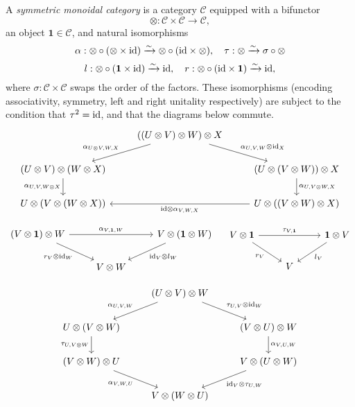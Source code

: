 \documentclass{MetricNotes2023}
\def\id{\ensuremath\text{id}}
\begin{document}
\begin{definition}\label{def:monoidal}
A \textit{symmetric monoidal category} is a category \(\mathcal{C}\) equipped with a bifunctor 
\[\otimes : \mathcal{C} \times \mathcal{C}\to \mathcal{C},\]
an object \(\textbf{1}\in \mathcal{C}\), and natural isomorphisms
\[\alpha : \otimes \circ (\otimes \times \id) \xrightarrow{\sim}\otimes \circ (\id \times \otimes),\quad \tau : \otimes \xrightarrow\sim \sigma \circ \otimes\]
\[l : \otimes \circ (\textbf{1}\times \id)\xrightarrow\sim \id, \quad r : \otimes \circ (\id \times \textbf{1})\xrightarrow\sim \id,\]
where \(\sigma : \mathcal{C} \times \mathcal{C}\) swaps the order of the factors. These isomorphisms (encoding associativity, symmetry, left and right unitality respectively) are subject to the condition that \(\tau^2=\id\), and that the diagrams below commute.
\[\begin{tikzcd}
& ((U\otimes V)\otimes W)\otimes X \arrow[ld, swap, "\alpha_{U\otimes V, W, X}"] \arrow[rd, "\alpha_{U, V, W}\otimes \id_X"]  & \\
(U\otimes V)\otimes (W\otimes X) \arrow[d, swap, "\alpha_{U, V, W\otimes X}"]  & & (U\otimes(V\otimes W))\otimes X \arrow[d, "\alpha_{U, V\otimes W, X}"]\\
U\otimes(V\otimes(W\otimes X)) & & U\otimes((V\otimes W)\otimes X) \arrow[ll, "\id\otimes \alpha_{V, W,X}"]
\end{tikzcd}\]

\[\begin{tikzcd}
(V\otimes \textbf{1})\otimes W \arrow[rr, "\alpha_{V, \textbf{1}, W}"] \arrow[dr, swap, "r_V\otimes \id_W"]  & & V\otimes (\textbf{1}\otimes W) \arrow[dl, "\id_V\otimes l_W"]  \\
& V\otimes W & 
\end{tikzcd} \quad \begin{tikzcd}
V\otimes \textbf{1} \arrow[rr, "\tau_{V, \textbf{1}}"] \arrow[dr, swap, "r_V"]  & & \textbf{1}\otimes V \arrow[dl, "l_V"]  \\
& V & 
\end{tikzcd}\]

\[\begin{tikzcd}
& (U\otimes V)\otimes W \arrow[ld, swap, "\alpha_{U, V, W}"] \arrow[dr, "\tau_{U, V}\otimes\id_W"]  &  \\
U\otimes (V\otimes W) \arrow[d, swap, "\tau_{U, V\otimes W}"] & & (V\otimes U)\otimes W \arrow[d, "\alpha_{V, U, W}"]  \\
(V\otimes W)\otimes U \arrow[dr, swap, "\alpha_{V, W, U}"] & & V\otimes (U\otimes W) \arrow[dl, "\id_V \otimes \tau_{U, W}"]\\
& V\otimes (W\otimes U) &
\end{tikzcd}\]

\end{definition}
\end{document}
